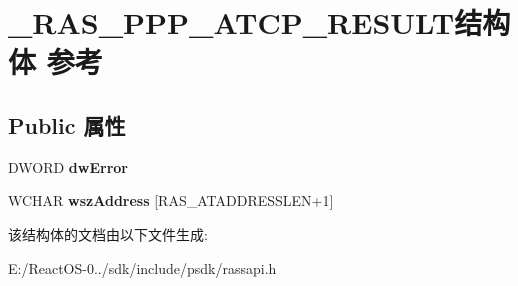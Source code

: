 \hypertarget{struct___r_a_s___p_p_p___a_t_c_p___r_e_s_u_l_t}{}\section{\+\_\+\+R\+A\+S\+\_\+\+P\+P\+P\+\_\+\+A\+T\+C\+P\+\_\+\+R\+E\+S\+U\+L\+T结构体 参考}
\label{struct___r_a_s___p_p_p___a_t_c_p___r_e_s_u_l_t}
\subsection*{Public 属性}
\begin{DoxyCompactItemize}
\item 
\mbox{\label{struct___r_a_s___p_p_p___a_t_c_p___r_e_s_u_l_t_a6908e72045271ec4e4e8c6bde62f1cc8}} 
D\+W\+O\+RD {\bfseries dw\+Error}
\item 
\mbox{\label{struct___r_a_s___p_p_p___a_t_c_p___r_e_s_u_l_t_a5c47339272bca6be43f699c17627467f}} 
W\+C\+H\+AR {\bfseries wsz\+Address} \mbox{[}R\+A\+S\+\_\+\+A\+T\+A\+D\+D\+R\+E\+S\+S\+L\+EN+1\mbox{]}
\end{DoxyCompactItemize}


该结构体的文档由以下文件生成\+:\begin{DoxyCompactItemize}
\item 
E\+:/\+React\+O\+S-\/0../sdk/include/psdk/rassapi.\+h\end{DoxyCompactItemize}
